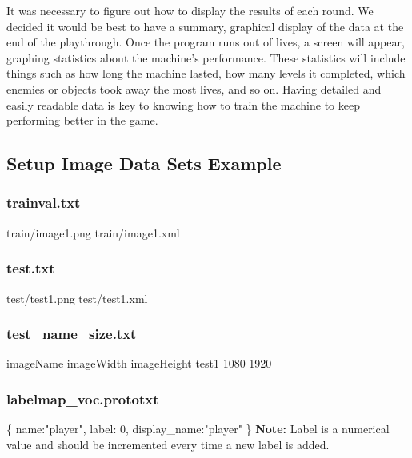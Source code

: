 It was necessary to figure out how to display the results of each round.
We decided it would be best to have a summary, graphical display of the data at the end of the playthrough.
Once the program runs out of lives, a screen will appear, graphing statistics about the machine's performance.
These statistics will include things such as how long the machine lasted, how many levels it completed, which enemies or objects took away the most lives, and so on.
Having detailed and easily readable data is key to knowing how to train the machine to keep performing better in the game.


\newpage

\subsection{Setup Image Data Sets Example}\label{sssec:num33}

\subsubsection{trainval.txt}
train/image1.png train/image1.xml

\subsubsection{test.txt}
test/test1.png test/test1.xml

\subsubsection{test_name_size.txt}
imageName imageWidth imageHeight\newline
test1     1080       1920

\subsubsection{labelmap_voc.prototxt}
\{\newline
name:"player",\newline
label: 0,\newline
display_name:"player"\newline
\}\newline
\textbf{Note:} Label is a numerical value and should be incremented every time a new label is added.

